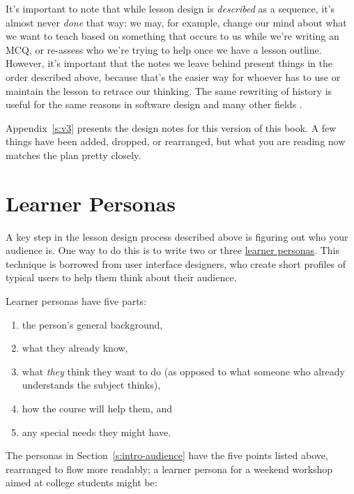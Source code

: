 It's important to note that while lesson design is \emph{described} as a
sequence, it's almost never \emph{done} that way: we may, for example,
change our mind about what we want to teach based on something that
occurs to us while we're writing an MCQ, or re-assess who we're trying
to help once we have a lesson outline. However, it's important that
the notes we leave behind present things in the order described above,
because that's the easier way for whoever has to use or maintain the
lesson to retrace our thinking. The same rewriting of history is
useful for the same reasons in software design and many other fields
\cite{Parn1986}.

Appendix~\ref{s:v3} presents the design notes for this version of this
book. A few things have been added, dropped, or rearranged, but what
you are reading now matches the plan pretty closely.

\section{Learner Personas}\label{s:process-personas}

A key step in the lesson design process described above is figuring
out who your audience is. One way to do this is to write two or three
\protect\hyperlink{g:learner-persona}{learner personas}. This technique is
borrowed from user interface designers, who create short profiles of
typical users to help them think about their audience.

Learner personas have five parts:

\begin{enumerate}
\tightlist
\item
  the person's general background,
\item
  what they already know,
\item
  what \emph{they} think they want to do (as opposed to what someone who already
  understands the subject thinks),
\item
  how the course will help them, and
\item
  any special needs they might have.
\end{enumerate}

The personas in Section~\ref{s:intro-audience} have the five points listed above,
rearranged to flow more readably; a learner persona for a weekend workshop aimed
at college students might be:

